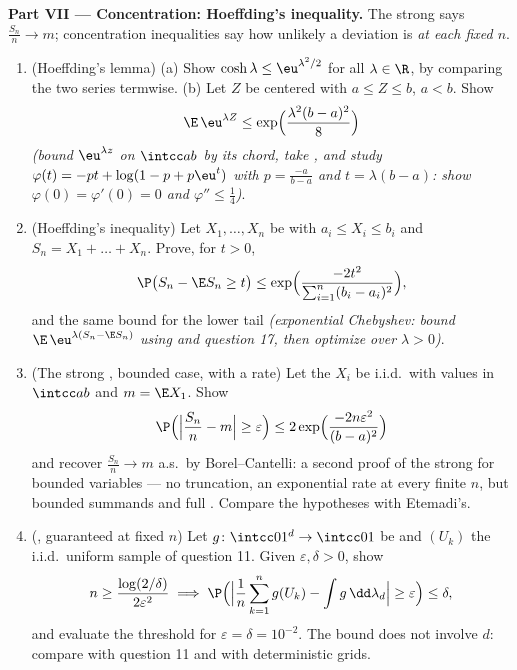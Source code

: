 \begin{problem}
\medskip
\noindent\textbf{Part VII --- Concentration: Hoeffding's
inequality.} The strong  says $\frac{S_n}n \to m$;
concentration inequalities say how unlikely a deviation is
\emph{at each fixed $n$}.
\begin{enumerate}[resume]
  \item (Hoeffding's lemma)
        (a) Show $\cosh\lambda \leq \eu^{\lambda^2/2}$ for
        all $\lambda \in \R$, by comparing the two series
        termwise.
        (b) Let $Z$ be centered with $a \leq Z \leq b$,
        $a < b$. Show
        \[
        \E\,\eu^{\lambda Z} \leq
        \exp\Bigl(\frac{\lambda^2(b - a)^2}8\Bigr)
        \]
        \emph{(bound $\eu^{\lambda z}$ on $\intcc ab$ by
        its chord, take , and study $\varphi(t)
        = -pt + \log(1 - p + p\eu^t)$ with $p =
        \frac{-a}{b-a}$ and $t = \lambda(b - a)$: show
        $\varphi(0) = \varphi'(0) = 0$ and $\varphi''
        \leq \frac14$)}.
  \item (Hoeffding's inequality) Let $X_1, \dots, X_n$ be
         with $a_i \leq X_i \leq b_i$ and $S_n =
        X_1 + \dots + X_n$. Prove, for $t > 0$,
        \[
        \P\bigl(S_n - \E S_n \geq t\bigr) \leq
        \exp\Bigl(\frac{-2t^2}{\sum_{i=1}^n(b_i -
        a_i)^2}\Bigr),
        \]
        and the same bound for the lower tail
        \emph{(exponential Chebyshev: bound
        $\E\,\eu^{\lambda(S_n - \E S_n)}$ using
         and question 17, then optimize over
        $\lambda > 0$)}.
  \item (The strong , bounded case, with a rate) Let the
        $X_i$ be i.i.d.\ with values in $\intcc ab$ and $m
        = \E X_1$. Show
        \[
        \P\Bigl(\Bigl|\frac{S_n}n - m\Bigr| \geq
        \varepsilon\Bigr) \leq
        2\exp\Bigl(\frac{-2n\varepsilon^2}{(b - a)^2}\Bigr)
        \]
        and recover $\frac{S_n}n \to m$ a.s.\ by
        Borel--Cantelli: a second proof of the strong 
        for bounded variables --- no truncation, an
        exponential rate at every finite $n$, but bounded
        summands and full . Compare the
        hypotheses with Etemadi's.
  \item (, guaranteed at fixed $n$) Let $g
        \colon \intcc01^d \to \intcc01$ be  and
        $(U_k)$ the i.i.d.\ uniform sample of question 11.
        Given $\varepsilon, \delta > 0$, show
        \[
        n \geq \frac{\log(2/\delta)}{2\varepsilon^2}
        \implies
        \P\Bigl(\Bigl|\frac1n\sum_{k=1}^ng(U_k) -
        \int g\,\dd\lambda_d\Bigr| \geq \varepsilon\Bigr)
        \leq \delta,
        \]
        and evaluate the threshold for $\varepsilon =
        \delta = 10^{-2}$. The bound does not involve $d$:
        compare with question 11 and with deterministic
        grids.
\end{enumerate}


\end{problem}
